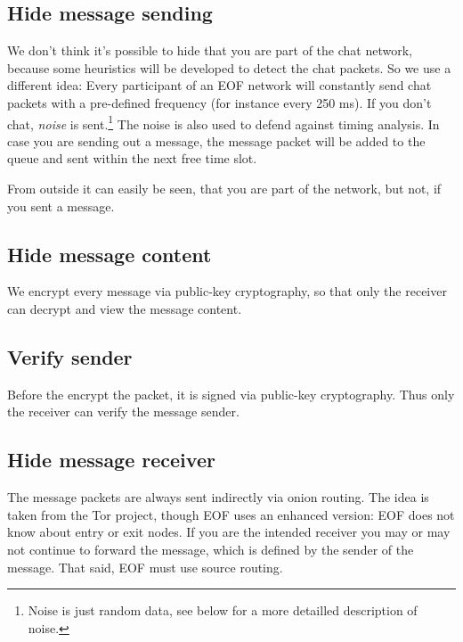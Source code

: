 \documentclass[12pt,a4paper]{book}
\begin{document}
\subsection{Hide message sending}
We don't think it's possible to hide that you are part of the chat network,
because some heuristics will be developed to detect the chat packets.
So we use a different idea:
Every participant of an EOF network will constantly send chat packets
with a pre-defined frequency (for instance every 250 ms).
If you don't chat, \emph{noise} is sent.\footnote{Noise is just random
data, see below for a more detailled description of noise.}
The noise is also used to defend against timing analysis.
In case you are sending out a message, the message packet will be added to the
queue and sent within the next free time slot.

From outside it can easily be seen, that you are part of the network,
but not, if you sent a message.
\subsection{Hide message content}
We encrypt every message via public-key cryptography\cite{pgp-1},
so that only the receiver can decrypt and view the message content.
\subsection{Verify sender}
Before the encrypt the packet, it is signed via public-key
cryptography\cite{pgp-1}. Thus only the receiver can verify the message sender.
\subsection{Hide message receiver}
The message packets are always sent indirectly via onion routing\cite{onion-1}.
The idea is taken from the Tor project\cite{tor-1}, though EOF uses an enhanced
version: EOF does not know about entry or exit nodes. If you are the intended
receiver you may or may not continue to forward the message, which is defined
by the sender of the message. That said, EOF must use source
routing\cite{source-routing-1}.
\end{document}
